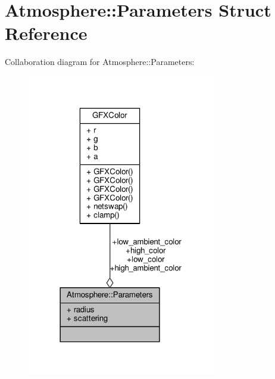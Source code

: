 \hypertarget{structAtmosphere_1_1Parameters}{}\section{Atmosphere\+:\+:Parameters Struct Reference}
\label{structAtmosphere_1_1Parameters}


Collaboration diagram for Atmosphere\+:\+:Parameters\+:
\nopagebreak
\begin{figure}[H]
\begin{center}
\leavevmode
\includegraphics[width=234pt]{d6/d8b/structAtmosphere_1_1Parameters__coll__graph}
\end{center}
\end{figure}
